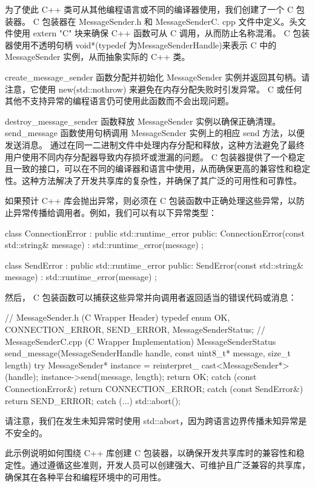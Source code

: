 为了使此 C++ 类可从其他编程语言或不同的编译器使用，我们创建了一个 C 包装器。 C 包装器在 MessageSender.h 和 MessageSenderC. cpp 文件中定义。头文件使用 extern "C" 块来确保 C++ 函数可从 C 调用，从而防止名称混淆。 C 包装器使用不透明句柄 void*(typedef 为MessageSenderHandle)来表示 C 中的 MessageSender 实例，从而抽象实际的 C++ 类。

create\_message\_sender 函数分配并初始化 MessageSender 实例并返回其句柄。请注意，它使用 new(std::nothrow) 来避免在内存分配失败时引发异常。 C 或任何其他不支持异常的编程语言仍可使用此函数而不会出现问题。

destroy\_message\_sender 函数释放 MessageSender 实例以确保正确清理。 send\_message 函数使用句柄调用 MessageSender 实例上的相应 send 方法，以便发送消息。
通过在同一二进制文件中处理内存分配和释放，这种方法避免了最终用户使用不同内存分配器导致内存损坏或泄漏的问题。 C 包装器提供了一个稳定且一致的接口，可以在不同的编译器和语言中使用，从而确保更高的兼容性和稳定性。这种方法解决了开发共享库的复杂性，并确保了其广泛的可用性和可靠性。

如果预计 C++ 库会抛出异常，则必须在 C 包装函数中正确处理这些异常，以防止异常传播给调用者。例如，我们可以有以下异常类型：

\begin{cpp}
class ConnectionError : public std::runtime_error {
public:
    ConnectionError(const std::string& message) : std::runtime_error(message) {}
};

class SendError : public std::runtime_error {
public:
    SendError(const std::string& message) : std::runtime_error(message) {}
};
\end{cpp}

然后， C 包装函数可以捕获这些异常并向调用者返回适当的错误代码或消息：

\begin{cpp}
// MessageSender.h (C Wrapper Header)
typedef enum {
    OK,
    CONNECTION_ERROR,
    SEND_ERROR,
} MessageSenderStatus;
// MessageSenderC.cpp (C Wrapper Implementation)
MessageSenderStatus send_message(MessageSenderHandle handle, const
uint8_t* message, size_t length) {
    try {
        MessageSender* instance = reinterpret_
        cast<MessageSender*>(handle);
        instance->send(message, length);
        return OK;
    } catch (const ConnectionError&) {
        return CONNECTION_ERROR;
    } catch (const SendError&) {
        return SEND_ERROR;
    } catch (...) {
        std::abort();
    }
}
\end{cpp}

请注意，我们在发生未知异常时使用 std::abort，因为跨语言边界传播未知异常是不安全的。

此示例说明如何围绕 C++ 库创建 C 包装器，以确保开发共享库时的兼容性和稳定性。通过遵循这些准则，开发人员可以创建强大、可维护且广泛兼容的共享库，确保其在各种平台和编程环境中的可用性。











